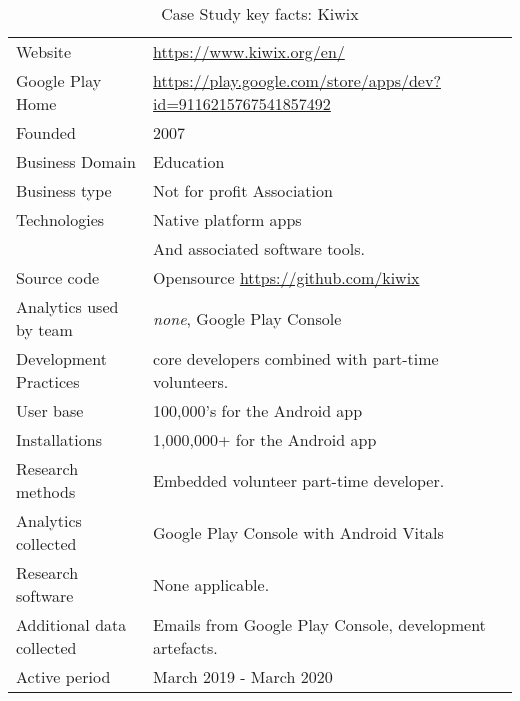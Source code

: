 {\renewcommand{\arraystretch}{0.8}%
\begin{table}[htbp!]
    \centering
    \small
    \setlength{\tabcolsep}{1pt}
    \begin{tabular}{lp{9cm}}
       \toprule
       Website &\url{https://www.kiwix.org/en/} \\
       Google Play Home & \url{https://play.google.com/store/apps/dev?id=9116215767541857492} \\
       Founded & 2007 \\
       Business Domain & Education \\
       Business type & Not for profit Association \\
       Technologies  & Native platform apps \\
       & And associated software tools. \\
       Source code  & Opensource \url{https://github.com/kiwix} \\
       Analytics used by team & \textit{none}\footnotemark, Google Play Console \\
       Development Practices & core developers combined with part-time volunteers. \\
       \midrule
       User base & 100,000's for the Android app \\
       Installations & 1,000,000+ for the Android app \\
       \midrule
       Research methods &Embedded volunteer part-time developer\footnotemark. \\
       Analytics collected &Google Play Console with Android Vitals \\
       Research software & None applicable. \\
       Additional data collected &Emails from Google Play Console, development artefacts. \\
       Active period & March 2019 - March 2020 \\
       \bottomrule
    \end{tabular}
    \caption{Case Study key facts: Kiwix}
    \label{tab:kiwix_anaytics_overview}
\end{table}
}


